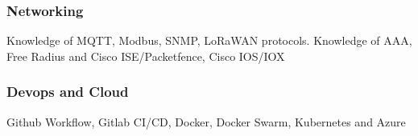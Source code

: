 \documentclass[10pt,a4paper]{article}
\begin{document}
  \subsubsection{Networking}
  Knowledge of MQTT, Modbus, SNMP, LoRaWAN protocols. Knowledge of AAA, Free Radius and Cisco ISE/Packetfence, Cisco IOS/IOX

  \subsubsection{Devops and Cloud}
  Github Workflow, Gitlab CI/CD, Docker, Docker Swarm, Kubernetes and Azure

\end{document}
